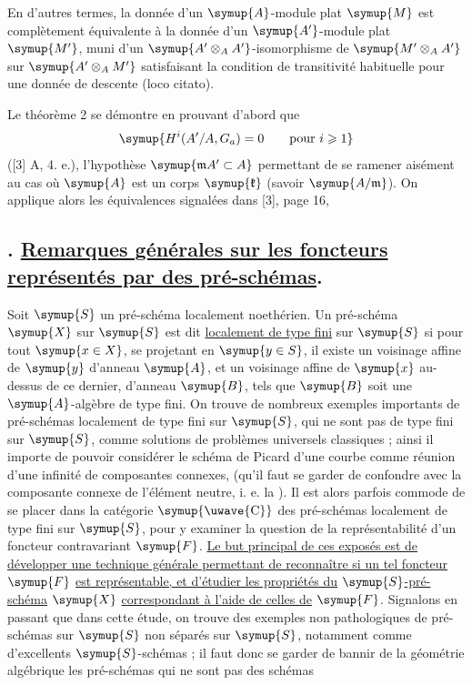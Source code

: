 En d'autres termes, la donnée d'un $\symup{A}$-module plat $\symup{M}$ est complètement
équivalente à la donnée d'un $\symup{A'}$-module plat $\symup{M'}$, muni d'un
$\symup{A'\otimes_AA'}$-isomorphisme de $\symup{M'\otimes_AA'}$ sur $\symup{A'\otimes_AM'}$
satisfaisant la condition de transitivité habituelle pour une donnée de
descente (loco citato).

Le théorème 2 se démontre en prouvant d'abord que
\[
  \symup{H^i(A'/A,G_a)=0\qquad\text{pour }i\geqslant 1}
\]
([3] A, 4. e.), l'hypothèse $\symup{\mathfrak mA'\subset A}$ permettant de se ramener
aisément au cas où $\symup{A}$ est un corps $\symup{\mathfrak k}$ (savoir $\symup{A/\mathfrak m}$). On applique
alors les équivalences signalées dans [3], page 16,


\subsection*{. \uline{Remarques générales sur les foncteurs représentés par des pré-schémas}.}

Soit $\symup{S}$ un pré-schéma localement noethérien. Un pré-schéma $\symup{X}$ sur $\symup{S}$ est dit
\uline{localement de type fini} sur $\symup{S}$ si pour tout $\symup{x\in X}$, se projetant en
$\symup{y\in S}$, il existe un
voisinage affine de $\symup{y}$ d'anneau $\symup{A}$, et un voisinage affine de $\symup{x}$ au-dessus
de ce dernier, d'anneau $\symup{B}$, tels que $\symup{B}$ soit une $\symup{A}$-algèbre de type fini.
On trouve de nombreux exemples importants de pré-schémas localement de type
fini sur $\symup{S}$, qui ne sont pas de type fini sur $\symup{S}$, comme solutions de
problèmes universels classiques ; ainsi il importe de pouvoir considérer le
schéma de Picard d'une courbe comme réunion d'une infinité de composantes
connexes, (qu'il faut se garder de confondre avec la composante connexe de
l'élément neutre, i. e. la ). Il est alors parfois commode
de se placer dans la catégorie $\symup{\text{\uwave{C}}}$ des pré-schémas localement de type
fini sur $\symup{S}$, pour y examiner la question de la représentabilité d'un foncteur
contravariant $\symup{F}$. \uline{Le but principal de ces exposés est de développer une
technique générale permettant de reconnaître si un tel foncteur} $\symup{F}$ \uline{est
représentable, et d'étudier les propriétés du} $\symup{S}$\uline{-pré-schéma} $\symup{X}$ \uline{correspondant
à l'aide de celles de} $\symup{F}$. Signalons en passant que dans cette étude, on
trouve des exemples non pathologiques de pré-schémas sur $\symup{S}$ non séparés sur
$\symup{S}$, notamment comme  d'excellents $\symup{S}$-schémas ; il
faut donc se garder de bannir de la géométrie algébrique les pré-schémas qui ne
sont pas des schémas

